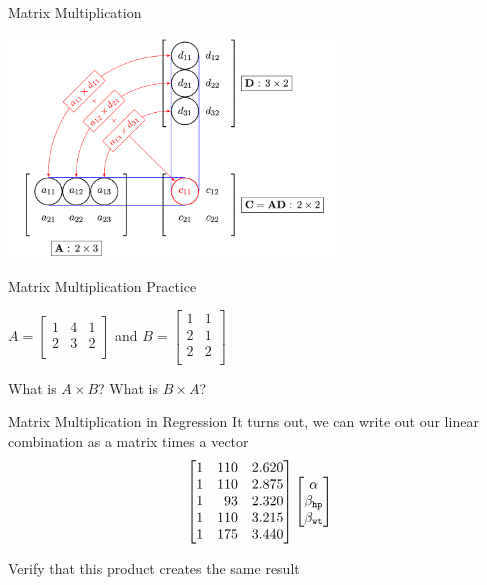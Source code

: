 \documentclass[aspectratio=169,t,11pt,table]{beamer}
\begin{document}
\begin{frame}{Matrix Multiplication}
  \begin{center}
    \includegraphics[width=0.65\textwidth]{figures/mat_mult.png}
  \end{center}
\end{frame}

\begin{frame}{Matrix Multiplication Practice}
  \begin{center}
    $A = \begin{bmatrix}
        1 & 4 & 1 \\
        2 & 3 & 2 \\
    \end{bmatrix}$ 
    and 
    $B = \begin{bmatrix}
      1 & 1 \\
      2 & 1 \\
      2 & 2 \\
    \end{bmatrix}$
  \end{center}

  \bigskip
  What is $A \times B$? What is $B \times A$?
\end{frame}

\begin{frame}{Matrix Multiplication in Regression}
  It turns out, we can write out our linear combination as a matrix times a vector
  $$
    \begin{bmatrix}
      1 & 110 & 2.620 \\ 
      1 & 110 & 2.875 \\ 
      1 & \hphantom{0}93 & 2.320 \\ 
      1 & 110 & 3.215 \\ 
      1 & 175 & 3.440
    \end{bmatrix}
    \begin{bmatrix}\alpha \\ \beta_{\texttt{hp}} \\ \beta_{\texttt{wt}}\end{bmatrix}
  $$

  \bigskip
  Verify that this product creates the same result
\end{frame}
\end{document}
